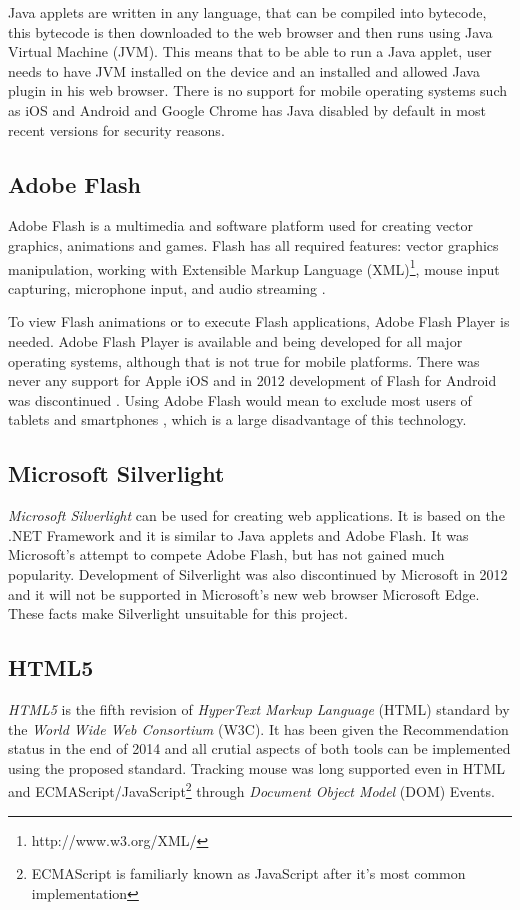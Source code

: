 Java applets are written in any language, that can be compiled into bytecode, this bytecode is then downloaded to the web browser and then runs using Java Virtual Machine (JVM). This means that to be able to run a Java applet, user needs to have JVM installed on the device and an installed and allowed Java plugin in his web browser. There is no support for mobile operating systems such as iOS and Android \cite{java_mobile} and Google Chrome has Java disabled by default in most recent versions  for security reasons.

\subsection{Adobe Flash}
Adobe Flash is a multimedia and software platform used for creating vector graphics, animations and games. Flash has all required features: vector graphics manipulation, working with Extensible Markup Language (XML)\footnote{http://www.w3.org/XML/}, mouse input capturing, microphone input, and audio streaming \cite{flash}. 

To view Flash animations or to execute Flash applications, Adobe Flash Player is needed. Adobe Flash Player is available and being developed for all major operating systems, although that is not true for mobile platforms. There was never any support for Apple iOS \cite{steve_jobs} and in 2012 development of Flash for Android was discontinued \cite{flash_mobile}. Using Adobe Flash would mean to exclude most users of tablets and smartphones \cite{mobile_statistics}, which is a large disadvantage of this technology.

\subsection{Microsoft Silverlight}
\textit{Microsoft Silverlight} \cite{silverlight} can be used for creating web applications. It is based on the .NET Framework and it is similar to Java applets and Adobe Flash. It was Microsoft's attempt to compete Adobe Flash, but has not gained much popularity. Development of Silverlight was also discontinued by Microsoft in 2012 and it will not be supported in Microsoft's new web browser Microsoft Edge\cite{silverlight_is_dead}. These facts make Silverlight unsuitable for this project.


\subsection{HTML5}
\textit{HTML5} is the fifth revision of \textit{HyperText Markup Language} (HTML) standard by the \textit{World Wide Web Consortium} (W3C). It has been given the Recommendation status in the end of 2014 and all crutial aspects of both tools can be implemented using the proposed standard. Tracking mouse was long supported even in HTML and ECMAScript/JavaScript\footnote{ECMAScript is familiarly known as JavaScript after it's most common implementation\cite{javascript_vs_ecmascript}} through \textit{Document Object Model} (DOM) Events\cite{dom_mouse_events}.

